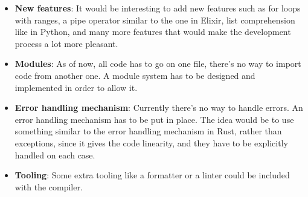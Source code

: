 ﻿\documentclass[10pt,a4paper,twocolumn,twoside]{article}
\begin{document}
\begin{itemize}
    \item \textbf{New features}: It would be interesting to add new features
        such as for loops with ranges, a pipe operator similar to the one in
        Elixir, list comprehension like in Python, and many more features that
        would make the development process a lot more pleasant.
    \item \textbf{Modules}: As of now, all code has to go on one file, there's
        no way to import code from another one. A module system has to be 
        designed and implemented in order to allow it.
    \item \textbf{Error handling mechanism}: Currently there's no way to handle
        errors. An error handling mechanism has to be put in place. The idea
        would be to use something similar to the error handling mechanism in 
        Rust, rather than exceptions, since it gives the code linearity, and 
        they have to be explicitly handled on each case.
    \item \textbf{Tooling}: Some extra tooling like a formatter or a linter
        could be included with the compiler.
\end{itemize}
\end{document}
